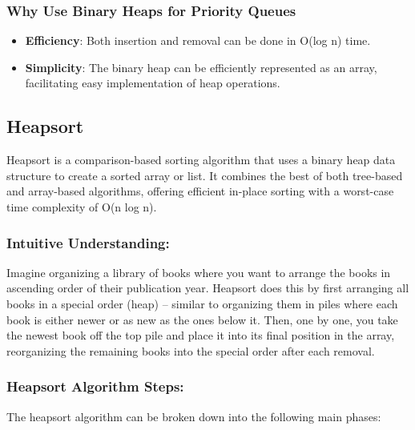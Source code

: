 \documentclass{article}
\begin{document}
\subsubsection*{Why Use Binary Heaps for Priority Queues}

\begin{itemize}
    \item \textbf{Efficiency}: Both insertion and removal can be done in O(log n) time.
    \item \textbf{Simplicity}: The binary heap can be efficiently represented as an array, facilitating easy implementation of heap operations.
\end{itemize}

\subsection{Heapsort}

Heapsort is a comparison-based sorting algorithm that uses a binary heap data structure to create a sorted array or list. It combines the best of both tree-based and array-based algorithms, offering efficient in-place sorting with a worst-case time complexity of O(n log n).

\subsubsection*{Intuitive Understanding:}

Imagine organizing a library of books where you want to arrange the books in ascending order of their publication year. Heapsort does this by first arranging all books in a special order (heap) -- similar to organizing them in piles where each book is either newer or as new as the ones below it. Then, one by one, you take the newest book off the top pile and place it into its final position in the array, reorganizing the remaining books into the special order after each removal.

\subsubsection*{Heapsort Algorithm Steps:}

The heapsort algorithm can be broken down into the following main phases:
\end{document}
